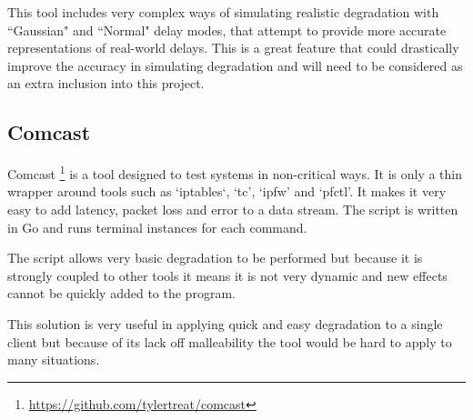 This tool includes very complex ways of simulating realistic degradation with ``Gaussian" and ``Normal" delay modes, that attempt to provide more accurate representations of real-world delays. This is a great feature that could drastically improve the accuracy in simulating degradation and will need to be considered as an extra inclusion into this project.

\subsection{Comcast}
Comcast \footnote{\url{https://github.com/tylertreat/comcast}} is a tool designed to test systems in non-critical ways. It is only a thin wrapper around tools such as `iptables`, `tc', `ipfw' and `pfctl'. It makes it very easy to add latency, packet loss and error to a data stream. The script is written in Go and runs terminal instances for each command.

The script allows very basic degradation to be performed but because it is strongly coupled to other tools it means it is not very dynamic and new effects cannot be quickly added to the program.

This solution is very useful in applying quick and easy degradation to a single client but because of its lack off malleability the tool would be hard to apply to many situations.